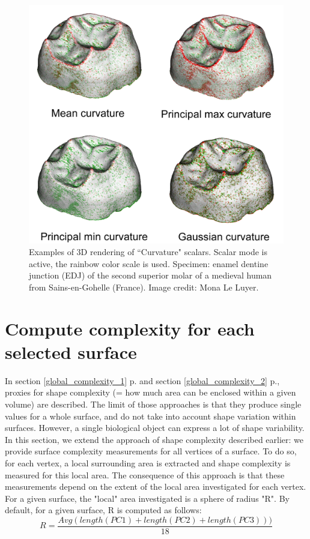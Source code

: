 \begin{figure}
  \centering
  \includegraphics[scale=0.3]{images/11/curvature_example.png} 
	\caption{
Examples of 3D rendering of ``Curvature" scalars. Scalar mode is active, the rainbow color scale is used. Specimen: enamel dentine junction (EDJ) of the second superior molar of a medieval human from Sains-en-Gohelle (France). Image credit: Mona Le Luyer.}
\label{curvature_example}
 
\end{figure}

\section{Compute complexity for each selected surface}
In section \ref{global_complexity_1} p.\pageref{global_complexity_1} and section \ref{global_complexity_2} p.\pageref{global_complexity_2}, proxies for shape complexity (= how much area can be enclosed within a given volume) are described. The limit of those approaches is that they produce single values for a whole surface, and do not take into account shape variation within surfaces. However, a single biological object can express a lot of shape variability. In this section, we extend the approach of shape complexity described earlier: we provide surface complexity measurements for all vertices of a surface. To do so, for each vertex, a local surrounding area is extracted and shape complexity is measured for this local area. The consequence of this approach is that these measurements depend on the extent of the local area investigated for each vertex. For a given surface, the "local" area investigated is a sphere of radius "R".  By default, for a given surface, R is computed as follows:
\begin{equation}
R = \dfrac{Avg(length(PC1)+length(PC2)+length(PC3)))}{18}
\end{equation}
 
